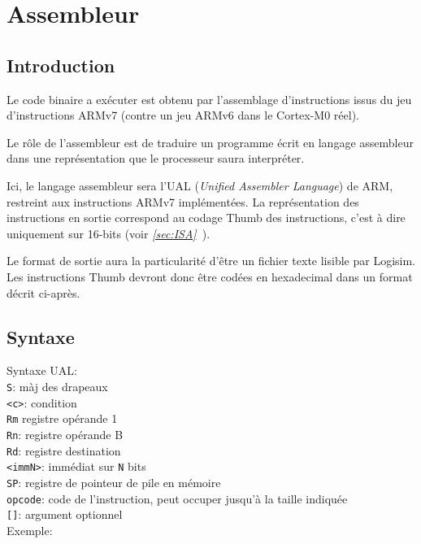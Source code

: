 \documentclass{article}
\begin{document}
    \section{Assembleur}
    \label{sec:ASM}

    \subsection{Introduction}

    Le code binaire a exécuter est obtenu par l'assemblage d'instructions issus du jeu d'instructions ARMv7 (contre un jeu ARMv6 dans le Cortex-M0 réel).

    Le rôle de l'assembleur est de traduire un programme écrit en langage assembleur dans une représentation que le processeur saura interpréter.

    Ici, le langage assembleur sera l'UAL (\textit{Unified Assembler Language}) de ARM, restreint aux instructions ARMv7 implémentées.
    La représentation des instructions en sortie correspond au codage Thumb des instructions, c'est à dire uniquement sur 16-bits (voir \textit{\ref{sec:ISA}~}).

    Le format de sortie aura la particularité d'être un fichier texte lisible par Logisim.
    Les instructions Thumb devront donc être codées en hexadecimal dans un format décrit ci-après.

    \subsection{Syntaxe}
    Syntaxe UAL:\\
    \texttt{S}: màj des drapeaux\\
    \texttt{<c>}: condition\\
    \texttt{Rm} registre opérande 1\\
    \texttt{Rn}: registre opérande B\\
    \texttt{Rd}: registre destination\\
    \texttt{<immN>}: immédiat sur \texttt{N} bits\\
    \texttt{SP}: registre de pointeur de pile en mémoire\\
    \texttt{opcode}: code de l'instruction, peut occuper jusqu'à la taille indiquée\\
    \texttt{[]}: argument optionnel\\

    Exemple:
\end{document}

